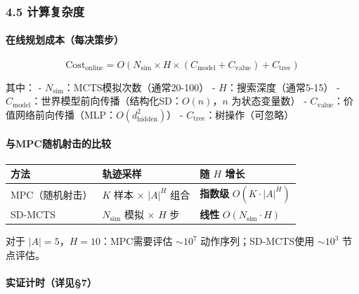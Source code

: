 \documentclass[UTF8]{ctexart}
\let\oldparagraph\paragraph
\renewcommand{\paragraph}[1]{\oldparagraph{#1}\mbox{}}
\begin{document}
\hypertarget{ux8ba1ux7b97ux590dux6742ux5ea6}{%
\subsubsection{4.5 计算复杂度}\label{ux8ba1ux7b97ux590dux6742ux5ea6}}

\hypertarget{ux5728ux7ebfux89c4ux5212ux6210ux672cux6bcfux51b3ux7b56ux6b65}{%
\paragraph{在线规划成本（每决策步）}\label{ux5728ux7ebfux89c4ux5212ux6210ux672cux6bcfux51b3ux7b56ux6b65}}

\[
\text{Cost}_{\text{online}} = O\left(N_{\text{sim}} \times H \times \left(C_{\text{model}} + C_{\text{value}}\right) + C_{\text{tree}}\right)
\]

其中： - \(N_{\text{sim}}\)：MCTS模拟次数（通常20-100） -
\(H\)：搜索深度（通常5-15） -
\(C_{\text{model}}\)：世界模型前向传播（结构化SD：\(O(n)\)，\(n\)
为状态变量数） -
\(C_{\text{value}}\)：价值网络前向传播（MLP：\(O(d_{\text{hidden}}^2)\)）
- \(C_{\text{tree}}\)：树操作（可忽略）

\hypertarget{ux4e0empcux968fux673aux5c04ux51fbux7684ux6bd4ux8f83}{%
\paragraph{与MPC随机射击的比较}\label{ux4e0empcux968fux673aux5c04ux51fbux7684ux6bd4ux8f83}}

\begin{table}[h]
\centering
\begin{tabular}{p{4cm}p{6cm}p{4cm}}
\toprule
\textbf{方法} & \textbf{轨迹采样} & \textbf{随 \(H\) 增长} \\
\midrule
MPC（随机射击） & \(K\) 样本 × \(\lvert A\rvert^H\) 组合 & \textbf{指数级} \(O(K \cdot \lvert A\rvert^H)\) \\
SD-MCTS & \(N_{\text{sim}}\) 模拟 × \(H\) 步 & \textbf{线性} \(O(N_{\text{sim}} \cdot H)\) \\
\bottomrule
\end{tabular}
\end{table}

对于 \(\lvert A\rvert=5\)，\(H=10\)：MPC需要评估 \(\sim 10^7\)
动作序列；SD-MCTS使用 \(\sim 10^3\) 节点评估。

\hypertarget{ux5b9eux8bc1ux8ba1ux65f6ux8be6ux89c17}{%
\paragraph{实证计时（详见§7）}\label{ux5b9eux8bc1ux8ba1ux65f6ux8be6ux89c17}}
\end{document}
